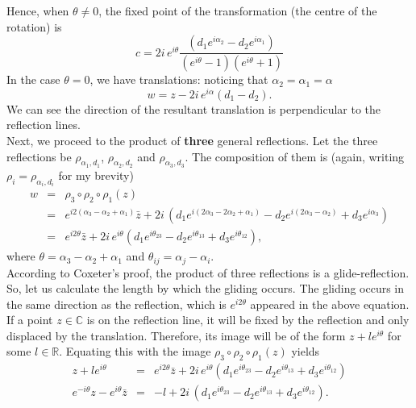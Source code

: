 \documentclass{article}
\begin{document}
Hence, when \(\theta \ne 0\), the fixed point of the transformation (the centre of the rotation) is
\begin{equation}
c =  2i \, e^{i\theta}\frac{( d_{1} e^{i\alpha_{2}} - d_{2} e^{i\alpha_{1}}) }{(e^{i\theta} - 1)(e^{i\theta} + 1)} \nonumber 
\end{equation}
In the case \(\theta = 0\), we have translations: noticing that \(\alpha_{2} = \alpha_{1} = \alpha\) 
\begin{equation}
w = z - 2i \, e^{i\alpha} ( d_{1}  - d_{2}).
\end{equation}
We can see the direction of the resultant translation is perpendicular to the reflection lines.\\

Next, we proceed to the product of \textbf{three} general reflections. Let the three reflections be \(\rho_{\alpha_{1}, d_{1}}\), \(\rho_{\alpha_{2},d_{2}}\) and \(\rho_{\alpha_{3},d_{3}}\).
The composition of them is (again, writing \(\rho_{i} = \rho_{\alpha_{i}, d_{i}}\) for my brevity)
\begin{eqnarray}
w &=& \rho_{3} \circ \rho_{2} \circ \rho_{1} (z) \nonumber \\
  &=& e^{i2(\alpha_{3} - \alpha_{2} + \alpha_{1})} \bar{z} + 2i \, ( d_{1} e^{i(2\alpha_{3} - 2\alpha_{2} + \alpha_{1})} - d_{2} e^{i(2\alpha_{3} - \alpha_{2})} + d_{3} e^{i\alpha_{3}})  \nonumber \\
  &=& e^{i2\theta} \bar{z} + 2i \, e^{i\theta}( d_{1} e^{i\theta_{23}} - d_{2} e^{i\theta_{13}} + d_{3} e^{i\theta_{12}}),
\end{eqnarray}
where \(\theta = \alpha_{3} - \alpha_{2} + \alpha_{1}\) and \(\theta_{ij} = \alpha_{j} - \alpha_{i}\).\\
According to Coxeter's proof, the product of three reflections is a glide-reflection. So, let us calculate the length by which the gliding occurs.
The gliding occurs in the same direction as the reflection, which is \(e^{i2\theta}\) appeared in the above equation.
If a point \(z \in \mathbb{C}\) is on the reflection line, it will be fixed by the reflection and only displaced by the translation. 
Therefore, its image will be of the form \(z + l e^{i\theta}\) for some \(l \in \mathbb{R}\).
Equating this with the image \(\rho_{3} \circ \rho_{2} \circ \rho_{1} (z)\) yields
\begin{eqnarray}
\label{eq:orgd202919}
z + l e^{i\theta}  &=& e^{i2\theta} \bar{z} + 2i \, e^{i\theta}( d_{1} e^{i\theta_{23}} - d_{2} e^{i\theta_{13}} + d_{3} e^{i\theta_{12}}) \nonumber \\
e^{-i\theta} z - e^{i\theta} \bar{z}  &=& -l + 2i\,( d_{1} e^{i\theta_{23}} - d_{2} e^{i\theta_{13}} + d_{3} e^{i\theta_{12}}). 
\end{eqnarray}
\end{document}
